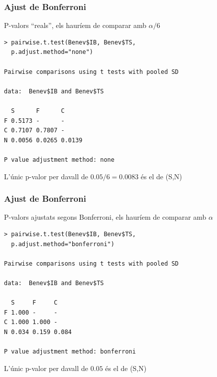 \documentclass[12pt,t]{beamer}
\theoremstyle{plain}
\theoremstyle{definition}
\begin{document}
\begin{frame}[fragile]
\frametitle{Ajust de Bonferroni} 

P-valors ``reals'', els hauríem de comparar amb $\alpha/6$\medskip


\begin{lstlisting}
> pairwise.t.test(Benev$IB, Benev$TS,
  p.adjust.method="none") 

Pairwise comparisons using t tests with pooled SD 

data:  Benev$IB and Benev$TS 

  S      F      C     
F 0.5173 -      -     
C 0.7107 0.7807 -     
N 0.0056 0.0265 0.0139

P value adjustment method: none 
\end{lstlisting}

L'únic p-valor per davall de $0.05/6=0.0083$ és el de (S,N)
\end{frame}


\begin{frame}[fragile]
\frametitle{Ajust de Bonferroni} 

P-valors ajustats segons Bonferroni, els hauríem de comparar amb $\alpha$\medskip

\begin{lstlisting}
> pairwise.t.test(Benev$IB, Benev$TS,
  p.adjust.method="bonferroni") 

Pairwise comparisons using t tests with pooled SD 

data:  Benev$IB and Benev$TS 

  S     F     C    
F 1.000 -     -    
C 1.000 1.000 -    
N 0.034 0.159 0.084

P value adjustment method: bonferroni 
\end{lstlisting}\medskip

L'únic p-valor per davall de $0.05$ és el de (S,N)
\end{frame}
\end{document}
